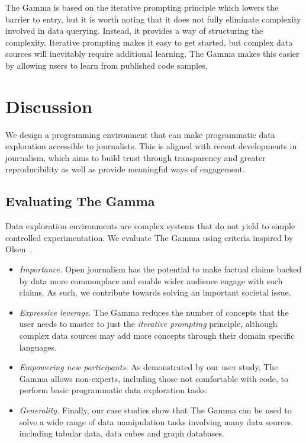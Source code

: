\documentclass[manuscript,review,anonymous]{acmart}
\begin{document}
The Gamma is based on the iterative prompting principle which lowers the barrier to entry, but
it is worth noting that it does not fully eliminate complexity involved in data querying.
Instead, it provides a way of structuring the complexity. Iterative prompting makes it easy to
get started, but complex data sources will inevitably require additional learning. The Gamma
makes this easier by allowing users to learn from published code samples.


\section{Discussion}
We design a programming environment that can make programmatic data exploration accessible
to journalists. This is aligned with recent developments in journalism, which aims to build
trust through transparency and greater reproducibility as well as provide meaningful ways of
engagement.

\subsection{Evaluating The Gamma}
Data exploration environments are complex systems that do not yield to simple controlled
experimentation. We evaluate The Gamma using criteria inspired by Olsen~\cite{evaluating}.

\begin{itemize}
\item \emph{Importance.} Open journalism has the potential to make factual claims backed by
data more commonplace and enable wider audience engage with such claims. As such, we contribute
towards solving an important societal issue.

\item \emph{Expressive leverage.} The Gamma reduces the number of concepts that the user needs
to master to just the \emph{iterative prompting} principle, although complex data sources may
add more concepts through their domain specific languages.

\item \emph{Empowering new participants.} As demonstrated by our user study, The Gamma allows
non-experts, including those not comfortable with code, to perform basic programmatic
data exploration tasks.

\item \emph{Generality.} Finally, our case studies show that The Gamma can be used to solve
a wide range of data manipulation tasks involving many data sources including tabular data,
data cubes and graph databases.
\end{itemize}
\end{document}
